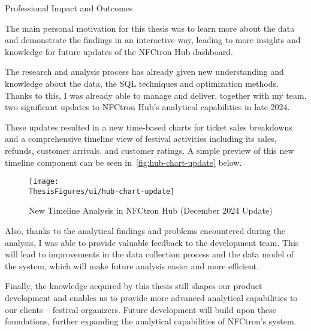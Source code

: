 \begin{section}{Professional Impact and Outcomes}
	\label{sec:future-impact}

	The main personal motivation for this thesis was to learn more about the data and demonstrate the findings in an interactive way, leading to more insights and knowledge for future updates of the NFCtron Hub dashboard.

	The research and analysis process has already given new understanding and knowledge about the data, the SQL techniques and optimization methods.
	Thanks to this, I was already able to manage and deliver, together with my team, two significant updates to NFCtron Hub's analytical capabilities in late 2024.

	These updates resulted in a new time-based charts for ticket sales breakdowns and a comprehensive timeline view of festival activities including its sales, refunds, customer arrivals, and customer ratings.
	A simple preview of this new timeline component can be seen in~\autoref{fig:hub-chart-update} below.

	\begin{figure}[H]
		\centering
		\texttt{[image: \\ThesisFigures/ui/hub-chart-update]}
		\caption{New Timeline Analysis in NFCtron Hub (December 2024 Update)}
		\label{fig:hub-chart-update}
	\end{figure}

	Also, thanks to the analytical findings and problems encountered during the analysis, I was able to provide valuable feedback to the development team.
	This will lead to improvements in the data collection process and the data model of the system, which will make future analysis easier and more efficient.

	Finally, the knowledge acquired by this thesis still shapes our product development and enables us to provide more advanced analytical capabilities to our clients – festival organizers.
	Future development will build upon these foundations, further expanding the analytical capabilities of NFCtron's system.
\end{section}